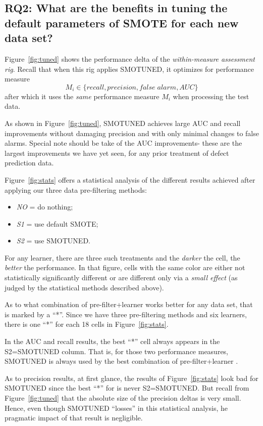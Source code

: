 \documentclass[10pt,conference]{IEEEtran}
\newcommand{\bi}{\begin{itemize}[leftmargin=0.4cm]}
\newcommand{\ei}{\end{itemize}}
\theoremstyle{break}
\theoremstyle{break}
\begin{document}
\subsection {RQ2: What are the benefits in tuning the default parameters of SMOTE for each new data set?}

Figure~\ref{fig:tuned} shows the performance delta of the {\em within-measure assessment rig}.
Recall that when this rig applies SMOTUNED, it optimizes for performance measure
\[M_i \in \{ 
\mathit{recall},
\mathit{precision}, 
\mathit{false\; alarm},
\mathit{AUC}
\}
\]
after which it uses the {\em same} performance measure
$M_i$ when processing the test data.

As shown in Figure~\ref{fig:tuned}, 
SMOTUNED achieves large AUC and recall improvements
without
 damaging precision and  with only minimal changes
 to false alarms. Special note should be take of the  AUC improvements- these are the largest improvements
 we have yet seen, for any prior treatment of defect prediction data.

Figure~\ref{fig:stats} offers a statistical analysis
of the different results achieved
after applying our three data pre-filtering methods:
\bi
\item  {\em NO} = do nothing;
\item {\em S1} = use default SMOTE;
\item {\em S2} = use SMOTUNED.
\ei
For any learner, there are three such treatments and the {\em darker} the cell, the {\em better} the performance. 
In that figure, cells with the same color are
either not statistically significantly different or
are different only via a {\em small effect}
(as judged by the statistical methods described above).

As to what combination of pre-filter+learner works better for any data set, that is marked by a ``*''. Since we have three pre-filtering methods and six learners, there is one   ``*'' for each 18 cells in Figure~\ref{fig:stats}.

In the  AUC and recall results,  the best ``*'' cell always appears in the S2=SMOTUNED column. 
That is, for those two performance measures,   SMOTUNED is always
used by the best combination of pre-filter+learner .

As to precision  results,  at first glance, the  results of Figure~\ref{fig:stats} look bad for SMOTUNED since
the best ``*''  for  is never S2=SMOTUNED.
 But recall from Figure~\ref{fig:tuned} that the absolute size of the precision   deltas is very small.  Hence, even though SMOTUNED ``losses'' in this statistical analysis, he pragmatic impact of that result  is  negligible.
 
\end{document}
